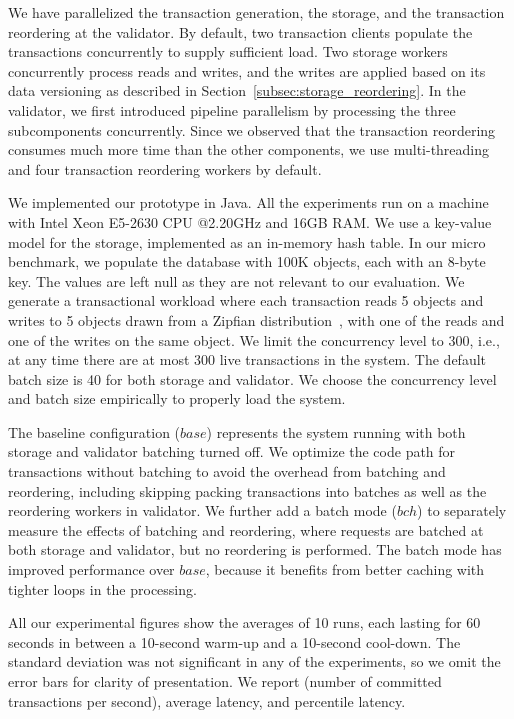 We have parallelized the transaction generation, the storage, and the transaction reordering at the validator. By default, two transaction clients populate the transactions concurrently to supply sufficient load. Two storage workers concurrently process reads and writes, 
and the writes are applied based on its data versioning as described in Section~\ref{subsec:storage_reordering}. 
In the validator, we first introduced pipeline parallelism by processing the three subcomponents concurrently. Since we observed that the transaction reordering consumes much more time than the other components, we use multi-threading and four transaction reordering workers by default.

We implemented our prototype in Java. All the experiments run on a machine with
Intel Xeon E5-2630 CPU @2.20GHz and 16GB RAM. We use a key-value model for the
storage, implemented as an in-memory hash table. In our micro benchmark, we populate the database with 100K objects, each with an 8-byte key. The values are left null as they are not relevant to our evaluation. We generate a transactional workload where each transaction reads 5 objects and writes to 5 objects drawn from a Zipfian distribution~\cite{gray1994quickly}, with one of the reads and one of the writes on the same object. We limit the concurrency level to 300, i.e., at any time there are at most 300 live transactions in the system. The default batch size is 40 for both storage and validator. We choose the concurrency level and batch size empirically to properly load the system.

The baseline configuration ($base$) represents the system running with both storage and validator batching turned off. We optimize the code path for transactions without batching to avoid the overhead from batching and reordering, including skipping packing transactions into batches as well as the reordering workers in validator. We further add a batch mode ($bch$) to separately measure the effects of batching and reordering, where requests are batched at both storage and validator, but no reordering is performed. The batch mode has improved performance over $base$, because it benefits from better caching with tighter loops in the processing. 

All our experimental figures show the averages of 10 runs, each lasting for 60 seconds in between a 10-second warm-up and a 10-second cool-down. The standard deviation was not significant in any of the experiments, so we omit the error bars for clarity of presentation. We report  (number of committed transactions per second), average latency, and percentile latency.

